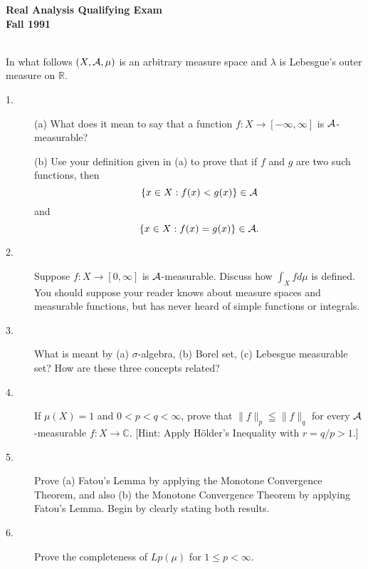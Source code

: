 \documentclass{article}
\def\R{\mathbb R}
\def\C{\mathbb C}
\begin{document}






\begin{center}\begin{LARGE}
{\bf Real Analysis Qualifying Exam}\\ 
{\bf Fall 1991}\\ \end{LARGE}
\end{center}
\vspace{0.1in}
\noindent\hrulefill\\

In what follows $(X, {\cal A}, \mu)$ is an arbitrary measure space and
$\lambda$ is Lebesgue's outer measure on $\R$.

\begin{description}
\item[1.] (a)
What does it mean to say that a function $f:X \to [-\infty, \infty]$
is ${\cal A}$-measurable?

\item[\quad] (b)
Use your definition given in (a) to prove that if $f$ and $g$ are two
such functions, then
$$\{x \in X : f(x) < g(x) \} \in {\cal A}$$
and
$$\{x \in X : f(x) = g(x)\} \in {\cal A}.$$

\item[2.]
Suppose $f : X \to [0, \infty]$ is ${\cal A}$-measurable. Discuss how
$\int_X f d\mu$ is defined. You should suppose your reader knows about
measure spaces and measurable functions, but has never heard of simple
functions or integrals.

\item[3.]
What is meant by (a) $\sigma$-algebra, (b) Borel set, (c) Lebesgue measurable
set? How are these three concepts related?

\item[4.]
If $\mu (X) = 1$ and $0 < p < q< \infty$, prove that
$\parallel f\parallel_p \leqq \parallel f \parallel_q$ for every
${\cal A}$-measurable $f:X \to \C$. [Hint: Apply H\"older's Inequality with
$r = q/p > 1$.]

\item[5.]
Prove (a) Fatou's Lemma by applying the Monotone Convergence Theorem, and
also (b) the Monotone Convergence Theorem by applying Fatou's Lemma. Begin
by clearly stating both results.

\item[6.]
Prove the completeness of $Lp(\mu)$ for $1 \leq p < \infty$.


\end{description}
\end{document}
